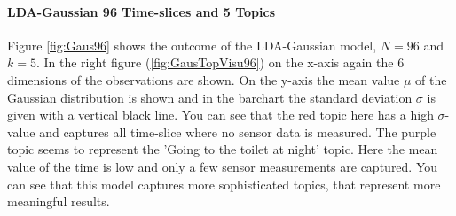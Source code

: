 \documentclass[a4paper,fleqn]{article}
\begin{document}
\paragraph{LDA-Gaussian 96 Time-slices and 5 Topics}
Figure \ref{fig:Gaus96} shows the outcome of the LDA-Gaussian model, $N=96$ and $k=5$. In the right figure (\ref{fig:GausTopVisu96}) on the x-axis again the 6 dimensions of the observations are shown. On the y-axis the mean value $\mu$ of the Gaussian distribution is shown and in the barchart the standard deviation $\sigma$ is given with a vertical black line. You can see that the red topic here has a high $\sigma$-value and captures all time-slice where no sensor data is measured. The purple topic seems to represent the 'Going to the toilet at night' topic. Here the mean value of the time is low and only a few sensor measurements are captured. You can see that this model captures more sophisticated topics, that represent more meaningful results.
\end{document}

